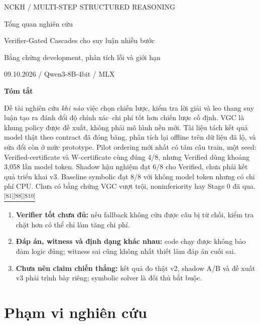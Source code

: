 \documentclass[11pt,a4paper]{article}
\newenvironment{researchnote}[1]
  {\par\addvspace{7pt}\Needspace{4\baselineskip}\begingroup\small
   \noindent{\sffamily\bfseries #1}\par\nobreak\noindent}
  {\par\endgroup\addvspace{5pt}}
\newenvironment{intuitionbox}[1]{\begin{researchnote}{#1}}{\end{researchnote}}
\newcommand{\src}[1]{\hyperlink{src-#1}{\textcolor{muted}{\textsuperscript{[S#1]}}}}
\begin{document}
\thispagestyle{opening}
{\sffamily\small\textcolor{muted}{NCKH / MULTI-STEP STRUCTURED REASONING}}\par
\vspace{8pt}
{\fontsize{27}{31}\selectfont Tổng quan nghiên cứu}\par
\vspace{3pt}
{\large Verifier-Gated Cascades cho suy luận nhiều bước}\par
\vspace{8pt}
{\sffamily\small\textcolor{muted}{Bằng chứng development, phân tích lỗi và giới hạn}}\par
{\sffamily\small\textcolor{muted}{09.10.2026 / Qwen3-8B-4bit / MLX}}\par
\vspace{12pt}
{\sffamily\small\bfseries Tóm tắt}\par
\noindent Đề tài nghiên cứu \emph{khi nào} việc chọn chiến lược, kiểm tra lời giải và leo thang suy luận tạo ra đánh đổi độ chính xác--chi phí tốt hơn chiến lược cố định. VGC là khung policy được đề xuất, không phải mô hình nền mới. Tài liệu tách kết quả model thật theo contract đã đóng băng, phân tích lại offline trên dữ liệu đã lộ, và sửa đổi còn ở mức prototype. Pilot ordering mới nhất có tám câu train, một seed: Verified-certificate và W-certificate cùng đúng 4/8, nhưng Verified dùng khoảng 3,058 lần model token. Shadow hậu nghiệm đạt 6/8 cho Verified, chưa phải kết quả triển khai v3. Baseline symbolic đạt 8/8 với không model token nhưng có chi phí CPU. Chưa có bằng chứng VGC vượt trội, noninferiority hay Stage 0 đã qua.\src{1}\src{8}\src{10}

\begin{intuitionbox}{Ba điểm chính}
\begin{enumerate}
  \item \textbf{Verifier tốt chưa đủ:} nếu fallback không cứu được câu bị từ chối, kiểm tra chặt hơn có thể chỉ làm tăng chi phí.
  \item \textbf{Đáp án, witness và định dạng khác nhau:} code chạy được không bảo đảm logic đúng; witness sai cũng không nhất thiết làm đáp án cuối sai.
  \item \textbf{Chưa nên claim chiến thắng:} kết quả đo thật v2, shadow A/B và đề xuất v3 phải trình bày riêng; symbolic solver là đối thủ bắt buộc.
\end{enumerate}
\end{intuitionbox}
\tableofcontents
\newpage

\section{Phạm vi nghiên cứu}
\end{document}
